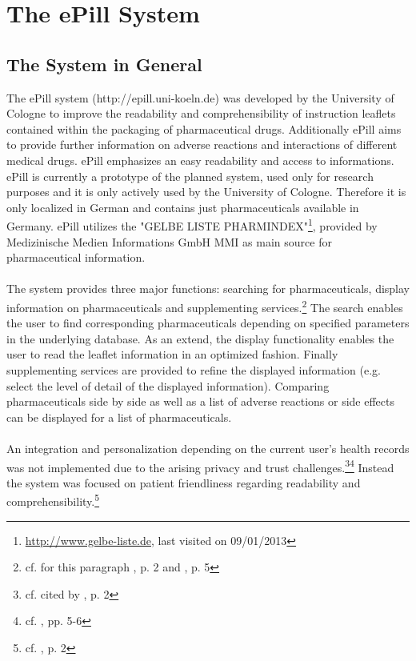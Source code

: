 \section{The ePill System}
\subsection{The System in General}
The ePill system (http://epill.uni-koeln.de) was developed by the University of Cologne to improve the readability and comprehensibility of instruction leaflets contained within the packaging of pharmaceutical drugs. Additionally ePill aims to provide further information on adverse reactions and interactions of different medical drugs. ePill emphasizes an easy readability and access to informations.
\\
ePill is currently a prototype of the planned system, used only for research purposes and it is only actively used by the University of Cologne. Therefore it is only localized in German and contains just pharmaceuticals available in Germany. ePill utilizes the "GELBE LISTE PHARMINDEX"\footnote{\url{http://www.gelbe-liste.de}, last visited on 09/01/2013}, provided by Medizinische Medien Informations GmbH MMI as main source for pharmaceutical information.
\\
\\
The system provides three major functions: searching for pharmaceuticals, display information on pharmaceuticals and supplementing services.\footnote{cf. for this paragraph \cite{Dehling.2012}, p. 2 and \cite{Dehling.2012b}, p. 5} The search enables the user to find corresponding pharmaceuticals depending on specified parameters in the underlying database. As an extend, the display functionality enables the user to read the leaflet information in an optimized fashion. Finally supplementing services are provided to refine the displayed information (e.g. select the level of detail of the displayed information). Comparing pharmaceuticals side by side as well as a list of adverse reactions or side effects can be displayed for a list of pharmaceuticals.
\\
\\
An integration and personalization depending on the current user's health records was not implemented due to the arising privacy and trust challenges.\footnote{cf. \cite{Kaletsch.2011} cited by \cite{Dehling.2012}, p. 2}\footnote{cf. \cite{Kaletsch.2011}, pp. 5-6} Instead the system was focused on patient friendliness regarding readability and comprehensibility.\footnote{cf. \cite{Dehling.2012b}, p. 2}
